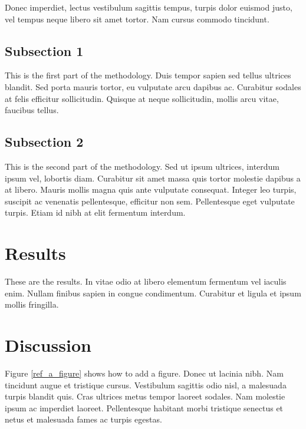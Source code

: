 \documentclass[12pt,turkish,a4paperpaper,]{report}
\begin{document}
Donec imperdiet, lectus vestibulum sagittis tempus, turpis dolor euismod
justo, vel tempus neque libero sit amet tortor. Nam cursus commodo
tincidunt.

\hypertarget{subsection-1}{%
\subsection{Subsection 1}\label{subsection-1}}

This is the first part of the methodology. Duis tempor sapien sed tellus
ultrices blandit. Sed porta mauris tortor, eu vulputate arcu dapibus ac.
Curabitur sodales at felis efficitur sollicitudin. Quisque at neque
sollicitudin, mollis arcu vitae, faucibus tellus.

\hypertarget{subsection-2-1}{%
\subsection{Subsection 2}\label{subsection-2-1}}

This is the second part of the methodology. Sed ut ipsum ultrices,
interdum ipsum vel, lobortis diam. Curabitur sit amet massa quis tortor
molestie dapibus a at libero. Mauris mollis magna quis ante vulputate
consequat. Integer leo turpis, suscipit ac venenatis pellentesque,
efficitur non sem. Pellentesque eget vulputate turpis. Etiam id nibh at
elit fermentum interdum.

\hypertarget{results-1}{%
\section{Results}\label{results-1}}

These are the results. In vitae odio at libero elementum fermentum vel
iaculis enim. Nullam finibus sapien in congue condimentum. Curabitur et
ligula et ipsum mollis fringilla.

\hypertarget{discussion-1}{%
\section{Discussion}\label{discussion-1}}

Figure \ref{ref_a_figure} shows how to add a figure. Donec ut lacinia
nibh. Nam tincidunt augue et tristique cursus. Vestibulum sagittis odio
nisl, a malesuada turpis blandit quis. Cras ultrices metus tempor
laoreet sodales. Nam molestie ipsum ac imperdiet laoreet. Pellentesque
habitant morbi tristique senectus et netus et malesuada fames ac turpis
egestas.
\end{document}
